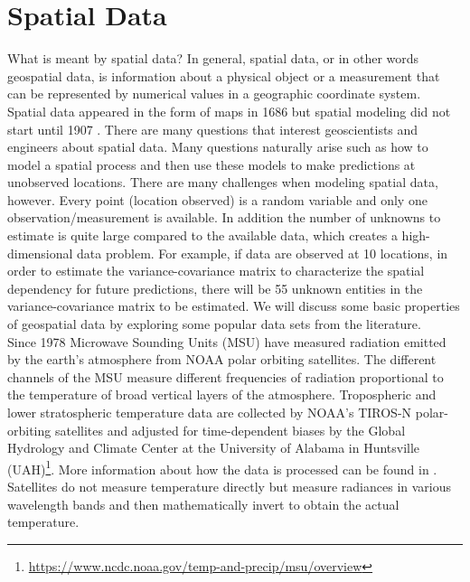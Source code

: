 %
%
%
%


\section{Spatial Data}

What is meant by spatial data? In general, spatial data, or in other words geospatial data, is information about a physical object or a measurement that can be represented by numerical values in a geographic coordinate system. Spatial data appeared in the form of maps in 1686 but spatial modeling did not start until 1907 \citep{Cressie1993}. There are many questions that interest geoscientists and engineers about spatial data. Many questions naturally arise such as how to model a spatial process and then use these models to make predictions at unobserved locations. There are many challenges when modeling spatial data, however. Every point (location observed) is a random variable and only one observation/measurement is available. In addition the number of unknowns to estimate is quite large compared to the available data, which creates a high-dimensional data problem. For example, if data are observed at 10 locations, in order to estimate the variance-covariance matrix to characterize the spatial dependency for future predictions, there will be 55 unknown entities in the variance-covariance matrix to be estimated. We will discuss some basic properties of geospatial data by exploring some popular data sets from the literature.\\

Since 1978 Microwave Sounding Units (MSU) have measured radiation emitted by the earth's atmosphere from NOAA polar orbiting satellites. The different channels of the MSU measure different frequencies of radiation proportional to the temperature of broad vertical layers of the atmosphere. Tropospheric and lower stratospheric temperature data are collected by NOAA's TIROS-N polar-orbiting satellites and adjusted for time-dependent biases by the Global Hydrology and Climate Center at the University of Alabama in Huntsville (UAH)\footnote{\url{https://www.ncdc.noaa.gov/temp-and-precip/msu/overview}}. More information about how the data is processed can be found in \cite{ChristySpencerBraswell2000}. Satellites do not measure temperature directly but measure radiances in various wavelength bands and then mathematically invert to obtain the actual temperature.

